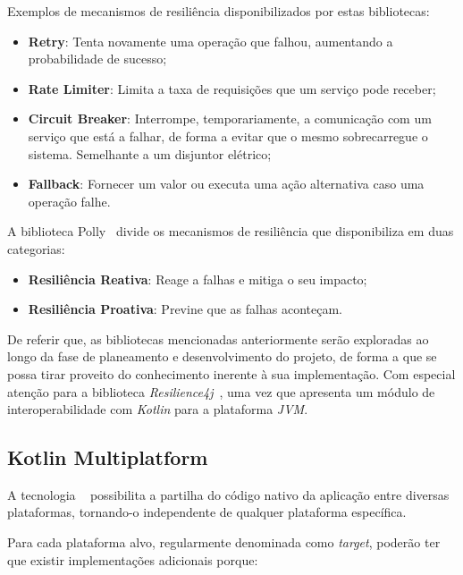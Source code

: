 Exemplos de mecanismos de resiliência disponibilizados por estas bibliotecas:

\begin{itemize}[topsep=0pt,itemsep=0pt,partopsep=0pt, parsep=0pt]
    \item \textbf{Retry}: Tenta novamente uma operação que falhou, aumentando a probabilidade de sucesso;
    \item \textbf{Rate Limiter}: Limita a taxa de requisições que um serviço pode receber;
    \item \textbf{Circuit Breaker}: Interrompe, temporariamente, a comunicação com um serviço que está a falhar, de forma a evitar que o mesmo sobrecarregue o sistema. Semelhante a um disjuntor elétrico;
    \item \textbf{Fallback}: Fornecer um valor ou executa uma ação alternativa caso uma operação falhe.
\end{itemize}

A biblioteca Polly~\cite{polly-dotnet} divide os mecanismos de resiliência que disponibiliza em duas categorias:

\begin{itemize}[topsep=0pt,itemsep=0pt,partopsep=0pt, parsep=0pt]
    \item \textbf{Resiliência Reativa}: Reage a falhas e mitiga o seu impacto;
    \item \textbf{Resiliência Proativa}: Previne que as falhas aconteçam.
\end{itemize}

De referir que, as bibliotecas mencionadas anteriormente serão exploradas ao longo da fase de planeamento e desenvolvimento do projeto, de forma a que se possa tirar proveito do conhecimento inerente à sua implementação.
Com especial atenção para a biblioteca \textit{Resilience4j}~\cite{resilience4j}, uma vez que apresenta um módulo de interoperabilidade com \textit{Kotlin} para a plataforma \textit{JVM}.

\subsection{Kotlin Multiplatform}

A tecnologia ~\cite{kmp} possibilita a partilha do código nativo da aplicação entre diversas plataformas, tornando-o independente de qualquer plataforma específica.

Para cada plataforma alvo, regularmente denominada como \textit{target}, poderão ter que existir implementações adicionais porque:

